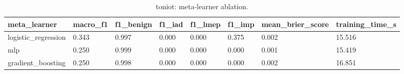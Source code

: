 \begin{table}[t]
\centering
\caption{toniot: meta-learner ablation.}
\label{tab:toniot_meta_learner_ablation}
\begin{tabular}{llllllll}
\toprule
meta\_learner & macro\_f1 & f1\_benign & f1\_iad & f1\_lmep & f1\_imp & mean\_brier\_score & training\_time\_s \\
\midrule
logistic\_regression & 0.343 & 0.997 & 0.000 & 0.000 & 0.375 & 0.002 & 15.516 \\
mlp & 0.250 & 0.999 & 0.000 & 0.000 & 0.000 & 0.001 & 15.419 \\
gradient\_boosting & 0.250 & 0.998 & 0.000 & 0.000 & 0.000 & 0.002 & 16.851 \\
\bottomrule
\end{tabular}
\end{table}
